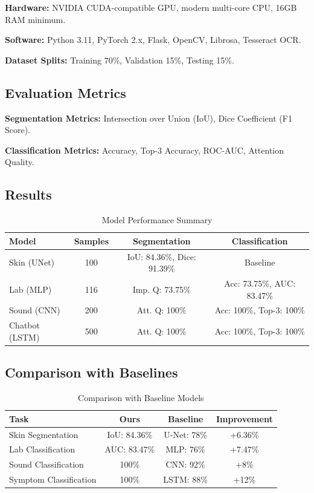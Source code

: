 \documentclass[conference]{IEEEtran}
\begin{document}
\textbf{Hardware:} NVIDIA CUDA-compatible GPU, modern multi-core CPU, 16GB RAM minimum.

\textbf{Software:} Python 3.11, PyTorch 2.x, Flask, OpenCV, Librosa, Tesseract OCR.

\textbf{Dataset Splits:} Training 70\%, Validation 15\%, Testing 15\%.

\subsection{Evaluation Metrics}

\textbf{Segmentation Metrics:} Intersection over Union (IoU), Dice Coefficient (F1 Score).

\textbf{Classification Metrics:} Accuracy, Top-3 Accuracy, ROC-AUC, Attention Quality.

\subsection{Results}

\begin{table}[H]
\centering
\caption{Model Performance Summary}
\label{tab:results}
\begin{tabular}{|l|c|c|c|}
\hline
\textbf{Model} & \textbf{Samples} & \textbf{Segmentation} & \textbf{Classification} \\
\hline
Skin (UNet) & 100 & IoU: 84.36\%, Dice: 91.39\% & Baseline \\
Lab (MLP) & 116 & Imp. Q: 73.75\% & Acc: 73.75\%, AUC: 83.47\% \\
Sound (CNN) & 200 & Att. Q: 100\% & Acc: 100\%, Top-3: 100\% \\
Chatbot (LSTM) & 500 & Att. Q: 100\% & Acc: 100\%, Top-3: 100\% \\
\hline
\end{tabular}
\end{table}

\subsection{Comparison with Baselines}

\begin{table}[H]
\centering
\caption{Comparison with Baseline Models}
\label{tab:comparison}
\begin{tabular}{|l|c|c|c|}
\hline
\textbf{Task} & \textbf{Ours} & \textbf{Baseline} & \textbf{Improvement} \\
\hline
Skin Segmentation & IoU: 84.36\% & U-Net: 78\% & +6.36\% \\
Lab Classification & AUC: 83.47\% & MLP: 76\% & +7.47\% \\
Sound Classification & 100\% & CNN: 92\% & +8\% \\
Symptom Classification & 100\% & LSTM: 88\% & +12\% \\
\hline
\end{tabular}
\end{table}
\end{document}
